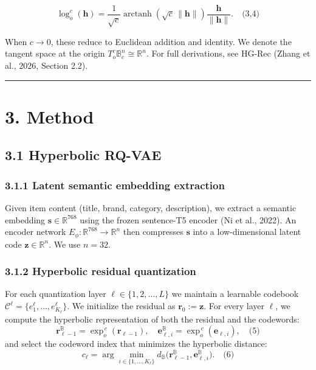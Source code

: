 \documentclass[11pt]{article}
\begin{document}
\[\log_o^c(\mathbf{h}) = \frac{1}{\sqrt{c}} \operatorname{arctanh}\!\left(\sqrt{c}\,\|\mathbf{h}\|\right) \frac{\mathbf{h}}{\|\mathbf{h}\|}.\quad\text{(3,4)}\]

When $c \to 0$, these reduce to Euclidean addition and identity. We denote the tangent space at the origin $T_o^c \mathbb{B}^n_c \cong \mathbb{R}^n$. For full derivations, see HG-Rec (Zhang et al., 2026, Section 2.2).

\noindent\rule{\textwidth}{0.4pt}


\section{3. Method}


\subsection{3.1 Hyperbolic RQ-VAE}


\subsubsection{3.1.1 Latent semantic embedding extraction}

Given item content (title, brand, category, description), we extract a semantic embedding $\mathbf{s} \in \mathbb{R}^{768}$ using the frozen sentence-T5 encoder (Ni et al., 2022). An encoder network $E_\phi: \mathbb{R}^{768} \to \mathbb{R}^n$ then compresses $\mathbf{s}$ into a low-dimensional latent code $\mathbf{z} \in \mathbb{R}^n$. We use $n = 32$.


\subsubsection{3.1.2 Hyperbolic residual quantization}

For each quantization layer $\ell \in \{1, 2, \ldots, L\}$ we maintain a learnable codebook $\mathcal{C}^\ell = \{e^\ell_1, \ldots, e^\ell_{K_\ell}\}$. We initialize the residual as $\mathbf{r}_0 := \mathbf{z}$. For every layer $\ell$, we compute the hyperbolic representation of both the residual and the codewords:
\[\mathbf{r}_{\ell-1}^{\mathbb{B}} = \exp^{\,c}_o(\mathbf{r}_{\ell-1}), \quad \mathbf{e}^{\mathbb{B}}_{\ell,i} = \exp^{\,c}_o(\mathbf{e}_{\ell,i}),\quad\text{(5)}\]
and select the codeword index that minimizes the hyperbolic distance:
\[c_\ell = \arg\min_{i \in \{1,\ldots,K_\ell\}} d_{\mathbb{B}}\bigl(\mathbf{r}_{\ell-1}^{\mathbb{B}}, \mathbf{e}^{\mathbb{B}}_{\ell,i}\bigr).\quad\text{(6)}\]
\end{document}
